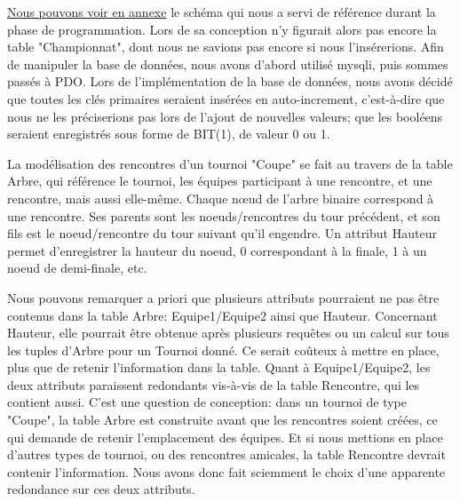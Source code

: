 \documentclass[12pt]{report}
\begin{document}
	    \par
	    \hypertarget{bdd-retour-annexe}{}
	    \hyperlink{annexe-bdd-tableref}{Nous pouvons voir en annexe}
	    le schéma qui nous a servi de référence durant la phase de programmation. Lors de sa conception n'y figurait alors pas encore la table "Championnat", dont nous ne savions pas encore si nous l'insérerions. Afin de manipuler la base de données, nous avons d'abord utilisé mysqli, puis sommes passés à PDO. Lors de l'implémentation de la base de données, nous avons décidé que toutes les clés primaires seraient insérées en auto-increment, c'est-à-dire que nous ne les préciserions pas lors de l'ajout de nouvelles valeurs; que les booléens seraient enregistrés sous forme de BIT(1), de valeur 0 ou 1.
	    \par
	    La modélisation des rencontres d'un tournoi "Coupe" se fait au travers de la table Arbre, qui référence le tournoi, les équipes participant à une rencontre, et une rencontre, mais aussi elle-même. Chaque nœud de l'arbre binaire correspond à une rencontre. Ses parents sont les noeuds/rencontres du tour précédent, et son fils est le noeud/rencontre du tour suivant qu'il engendre. Un attribut Hauteur permet d'enregistrer la hauteur du noeud, 0 correspondant à la finale, 1 à un noeud de demi-finale, etc. 
	    \par
	    Nous pouvons remarquer a priori que plusieurs attributs pourraient ne pas être contenus dans la table Arbre: Equipe1/Equipe2 ainsi que Hauteur.	Concernant Hauteur, elle pourrait être obtenue après plusieurs requêtes ou un calcul sur tous les tuples d'Arbre pour un Tournoi donné. Ce serait coûteux à mettre en place, plus que de retenir l'information dans la table. Quant à Equipe1/Equipe2, les deux attributs paraissent redondants vis-à-vis de la table Rencontre, qui les contient aussi. C'est une question de conception: dans un tournoi de type "Coupe", la table Arbre est construite avant que les rencontres soient créées, ce qui demande de retenir l'emplacement des équipes. Et si nous mettions en place d'autres types de tournoi, ou des rencontres amicales, la table Rencontre devrait contenir l'information. Nous avons donc fait sciemment le choix d'une apparente redondance sur ces deux attributs. 
        
\end{document}
